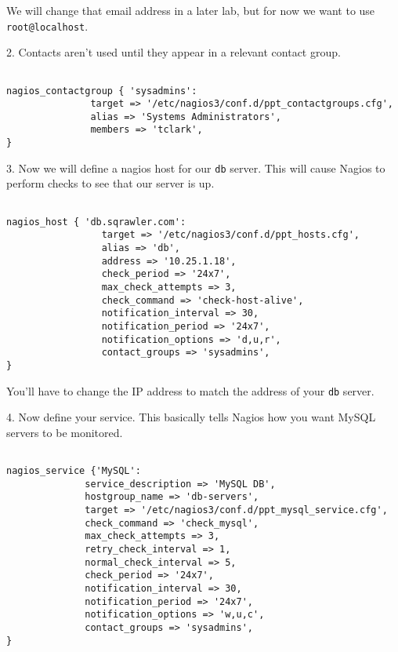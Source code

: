 \documentclass{article}         %
\begin{document}
We will change that email address in a later lab, but for now we want to use
\texttt{root@localhost}.

2. Contacts aren't used until they appear in a relevant contact group.

\begin{verbatim}

nagios_contactgroup { 'sysadmins':
               target => '/etc/nagios3/conf.d/ppt_contactgroups.cfg',
               alias => 'Systems Administrators',
               members => 'tclark', 
}

  \end{verbatim}



3. Now we will define a nagios host for our \texttt{db} server.
This will cause Nagios to perform checks to see that our server
is up.

\begin{verbatim}

nagios_host { 'db.sqrawler.com':
                 target => '/etc/nagios3/conf.d/ppt_hosts.cfg',
                 alias => 'db',
                 address => '10.25.1.18',
                 check_period => '24x7',
                 max_check_attempts => 3,
                 check_command => 'check-host-alive',
                 notification_interval => 30,
                 notification_period => '24x7',
                 notification_options => 'd,u,r',
                 contact_groups => 'sysadmins',
}
\end{verbatim}


You'll have to change the IP address to match the address of
your \texttt{db} server.

4. Now define your service.  This basically tells Nagios
how you want MySQL servers to be monitored.

\begin{verbatim}

nagios_service {'MySQL':
              service_description => 'MySQL DB',
              hostgroup_name => 'db-servers',
              target => '/etc/nagios3/conf.d/ppt_mysql_service.cfg',
              check_command => 'check_mysql',
              max_check_attempts => 3,
              retry_check_interval => 1,
              normal_check_interval => 5,
              check_period => '24x7',
              notification_interval => 30,
              notification_period => '24x7',
              notification_options => 'w,u,c',
              contact_groups => 'sysadmins',
}
\end{verbatim}
\end{document}
